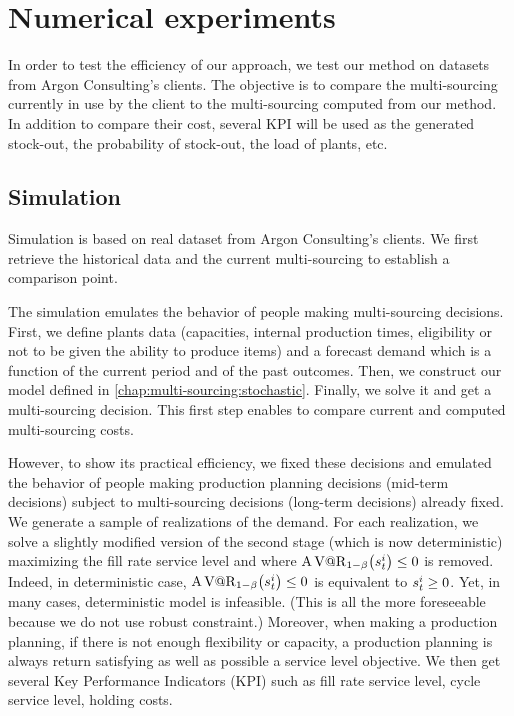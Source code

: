 \chapter{Numerical experiments}
\label{chap:multi-sourcing:numerical-experiments}


In order to test the efficiency of our approach, we test our method on datasets from Argon Consulting’s clients.
The objective is to compare the multi-sourcing currently in use by the client to the multi-sourcing computed from our method.
In addition to compare their cost, several KPI will be used as the generated stock-out, the probability of stock-out, the load of plants, etc.


\section{Simulation}


Simulation is based on real dataset from Argon Consulting’s clients.
We first retrieve the historical data and the current multi-sourcing to establish a comparison point.


The simulation emulates the behavior of people making multi-sourcing decisions.
First, we define plants data (capacities, internal production times, eligibility or not to be given the ability to produce items) and a forecast demand which is a function of the current period and of the past outcomes.
Then, we construct our model defined in \cref{chap:multi-sourcing:stochastic}.
Finally, we solve it and get a multi-sourcing decision.
This first step enables to compare current and computed multi-sourcing costs.


However, to show its practical efficiency, we fixed these decisions and emulated the behavior of people making production planning decisions (\ie mid-term decisions) subject to multi-sourcing decisions (\ie long-term decisions) already fixed.
We generate a sample of realizations of the demand.
For each realization, we solve a slightly modified version of the second stage (which is now deterministic) maximizing the fill rate service level and where $\AVaR_{1-\servicelvl}\bracket{\inventory_t^i}\le0$ is removed.
Indeed, in deterministic case, $\AVaR_{1-\servicelvl}\bracket{\inventory_t^i}\le0$ is equivalent to $s_t^i\ge0$.
Yet, in many cases, deterministic model is infeasible.
(This is all the more foreseeable because we do not use robust constraint.)
Moreover, when making a production planning, if there is not enough flexibility or capacity, a production planning is always return satisfying as well as possible a service level objective.
We then get several Key Performance Indicators (KPI) such as fill rate service level, cycle service level, holding costs.



